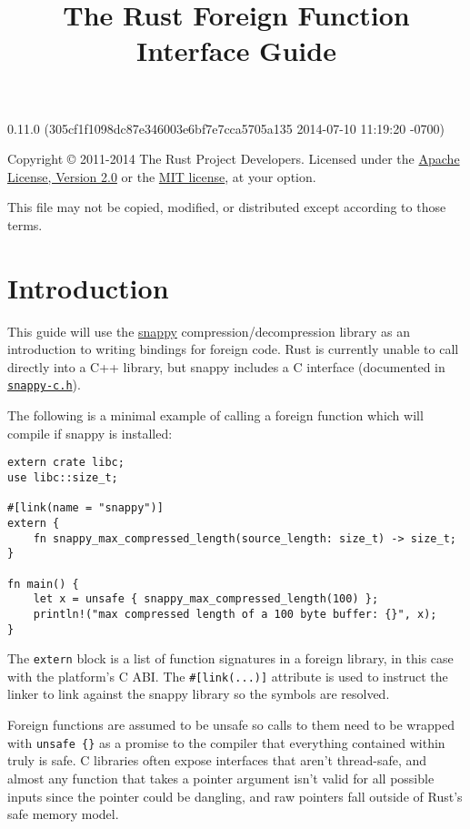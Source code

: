 \documentclass[]{article}
\title{The Rust Foreign Function Interface Guide}
\begin{document}
\maketitle

0.11.0 (305cf1f1098dc87e346003e6bf7e7cca5705a135 2014-07-10 11:19:20 -0700)

Copyright © 2011-2014 The Rust Project Developers. Licensed under the
\href{http://www.apache.org/licenses/LICENSE-2.0}{Apache License,
Version 2.0} or the \href{http://opensource.org/licenses/MIT}{MIT
license}, at your option.

This file may not be copied, modified, or distributed except according
to those terms.

{
\hypersetup{linkcolor=black}
\setcounter{tocdepth}{3}
\tableofcontents
}
\section{Introduction}\label{introduction}

This guide will use the \href{https://github.com/google/snappy}{snappy}
compression/decompression library as an introduction to writing bindings
for foreign code. Rust is currently unable to call directly into a C++
library, but snappy includes a C interface (documented in
\href{https://github.com/google/snappy/blob/master/snappy-c.h}{\texttt{snappy-c.h}}).

The following is a minimal example of calling a foreign function which
will compile if snappy is installed:

\begin{verbatim}
extern crate libc;
use libc::size_t;

#[link(name = "snappy")]
extern {
    fn snappy_max_compressed_length(source_length: size_t) -> size_t;
}

fn main() {
    let x = unsafe { snappy_max_compressed_length(100) };
    println!("max compressed length of a 100 byte buffer: {}", x);
}
\end{verbatim}

The \texttt{extern} block is a list of function signatures in a foreign
library, in this case with the platform's C ABI. The
\texttt{\#{[}link(...){]}} attribute is used to instruct the linker to
link against the snappy library so the symbols are resolved.

Foreign functions are assumed to be unsafe so calls to them need to be
wrapped with \texttt{unsafe \{\}} as a promise to the compiler that
everything contained within truly is safe. C libraries often expose
interfaces that aren't thread-safe, and almost any function that takes a
pointer argument isn't valid for all possible inputs since the pointer
could be dangling, and raw pointers fall outside of Rust's safe memory
model.
\end{document}
